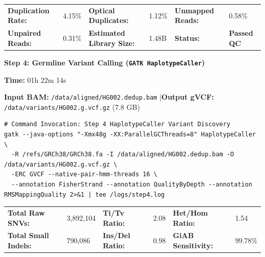 \documentclass[10pt,a4paper]{article}
\newcommand{\badge}[2]{%
  \tcbox[on line, arc=3pt, colback=#1, colframe=#1, boxrule=0pt, top=1.5pt, bottom=1.5pt, left=5pt, right=5pt]{%
    \scriptsize\bfseries #2%
  }%
}
\begin{document}
\begin{tcolorbox}[cardstyle, title={\scriptsize\color{NavyDark}\bfseries Duplicate Marking Statistics}]
  \scriptsize
  \begin{tabularx}{\textwidth}{@{} >{\bfseries}l X >{\bfseries}l X >{\bfseries}l X @{}}
    Duplication Rate: & 4.15\% & Optical Duplicates: & 1.12\% & Unmapped Reads: & 0.58\% \\
    Unpaired Reads: & 0.31\% & Estimated Library Size: & 1.48B & Status: & \textcolor{StatusGreen}{\textbf{Passed QC}} \\
  \end{tabularx}
\end{tcolorbox}

\pagebreak

\noindent
\begin{minipage}[t]{0.70\textwidth}
  \normalsize\bfseries\color{NavyDark} Step 4: Germline Variant Calling (\texttt{GATK HaplotypeCaller})
\end{minipage}%
\hfill
\begin{minipage}[t]{0.28\textwidth}
  \raggedleft
  \badge{StatusGreenBg}{\color{StatusGreen}\faCheck~\,PASS} \quad
  \scriptsize\textbf{Time:} 01h 22m 14s
\end{minipage}

\vspace{2pt}
{\scriptsize\textbf{Input BAM:} \texttt{/data/aligned/HG002.dedup.bam} \quad|\quad \textbf{Output gVCF:} \texttt{/data/variants/HG002.g.vcf.gz} (7.8 GB)}

\vspace{3pt}

\begin{tcolorbox}[codebox]
\begin{lstlisting}[style=bashstyle]
# Command Invocation: Step 4 HaplotypeCaller Variant Discovery
gatk --java-options "-Xmx48g -XX:ParallelGCThreads=8" HaplotypeCaller \
  -R /refs/GRCh38/GRCh38.fa -I /data/aligned/HG002.dedup.bam -O /data/variants/HG002.g.vcf.gz \
  -ERC GVCF --native-pair-hmm-threads 16 \
  --annotation FisherStrand --annotation QualityByDepth --annotation RMSMappingQuality 2>&1 | tee /logs/step4.log
\end{lstlisting}
\end{tcolorbox}

\begin{tcolorbox}[cardstyle, title={\scriptsize\color{NavyDark}\bfseries Variant Call Statistics \& Concordance Check}]
  \scriptsize
  \begin{tabularx}{\textwidth}{@{} >{\bfseries}l X >{\bfseries}l X >{\bfseries}l X @{}}
    Total Raw SNVs: & 3,892,104 & Ti/Tv Ratio: & 2.08 & Het/Hom Ratio: & 1.54 \\
    Total Small Indels: & 790,086 & Ins/Del Ratio: & 0.98 & GiAB Sensitivity: & 99.78\% \\
  \end{tabularx}
\end{tcolorbox}
\end{document}
